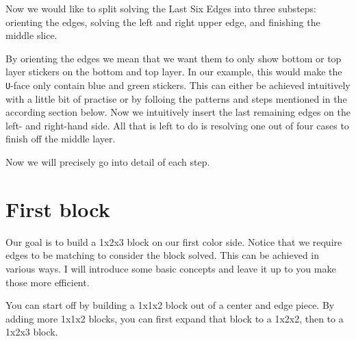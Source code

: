 \documentclass[a4paper]{scrreprt}
\begin{document}
Now we would like to split solving the Last Six Edges into three substeps: orienting the edges, solving the left and right upper edge, and finishing the middle slice.\par

By orienting the edges we mean that we want them to only show bottom or top layer stickers on the bottom and top layer. In our example, this would make the \texttt{U}-face only contain blue and green stickers. This can either be achieved intuitively with a little bit of practise or by folloing the patterns and steps mentioned in the according section below. Now we intuitively insert the last remaining edges on the left- and right-hand side. All that is left to do is resolving one out of four cases to finish off the middle layer.\par

Now we will precisely go into detail of each step.

\section{First block}
Our goal is to build a 1x2x3 block on our first color side. Notice that we require edges to be matching to consider the block solved. This can be achieved in various ways. I will introduce some basic concepts and leave it up to you make those more efficient.\par

You can start off by building a 1x1x2 block out of a center and edge piece. By adding more 1x1x2 blocks, you can first expand that block to a 1x2x2, then to a 1x2x3 block.\par
\end{document}

